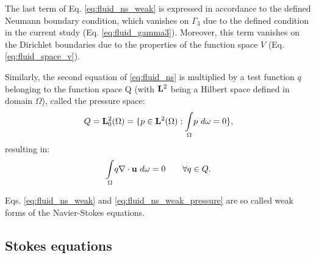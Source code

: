 \noindent The last term of Eq. \ref{eq:fluid_ns_weak} is expressed in accordance to the defined Neumann boundary condition, which vanishes on $\Gamma_3$ due to the defined condition in the current study (Eq. \ref{eq:fluid_gamma3}). Moreover, this term vanishes on the Dirichlet boundaries due to the properties of the function space $V$ (Eq. \ref{eq:fluid_space_v}).

Similarly, the second equation of \ref{eq:fluid_ns} is multiplied by a test function $q$ belonging to the function space Q (with ${\bf L}^2$ being a Hilbert space defined in domain $\Omega$), called the pressure space:
\begin{equation}
Q = {\bf L}^2_0(\Omega) = \lbrace p \in {\bf L}^2(\Omega) : {\mathop{\int}_{\Omega}} p \ d\omega = 0\rbrace,
\end{equation}
resulting in:
\begin{equation} \label{eq:fluid_ns_weak_pressure}
{\mathop{\int}_{\Omega}} q \nabla\cdot{\bf u}\ d\omega = 0 \qquad \forall q \in Q.
\end{equation}

Eqs. \ref{eq:fluid_ns_weak} and \ref{eq:fluid_ns_weak_pressure} are so called weak forms of the Navier-Stokes equations.

\subsection{Stokes equations}

